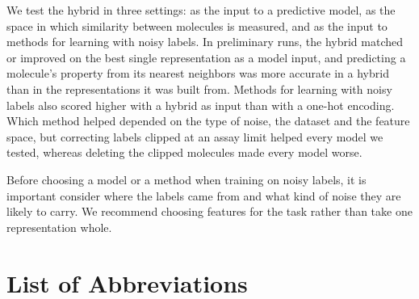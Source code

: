 \documentclass[a4paper,12pt]{report}
\begin{document}
We test the hybrid in three settings: as the input to a predictive model, as the space in which similarity between molecules is measured, and as the input to methods for learning with noisy labels. In preliminary runs, the hybrid matched or improved on the best single representation as a model input, and predicting a molecule's property from its nearest neighbors was more accurate in a hybrid than in the representations it was built from. Methods for learning with noisy labels also scored higher with a hybrid as input than with a one-hot encoding. Which method helped depended on the type of noise, the dataset and the feature space, but correcting labels clipped at an assay limit helped every model we tested, whereas deleting the clipped molecules made every model worse.

Before choosing a model or a method when training on noisy labels, it is important consider where the labels came from and what kind of noise they are likely to carry. We recommend choosing features for the task rather than take one representation whole.

\begin{singlespace}
\tableofcontents
\listoffigures
\listoftables
\end{singlespace}

\chapter*{List of Abbreviations}

\end{document}
